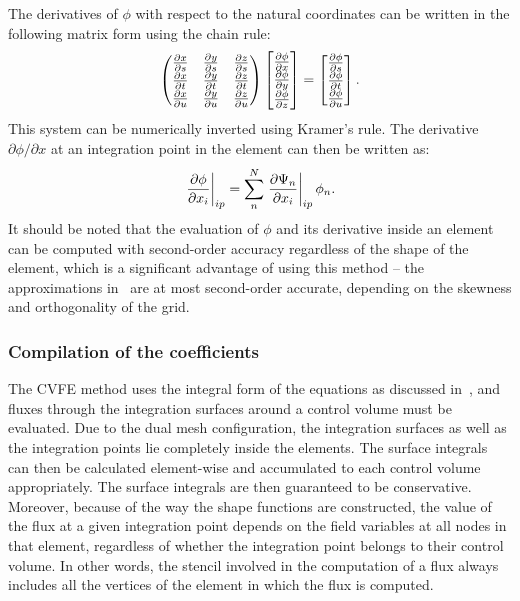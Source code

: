The derivatives of $\phi$ with respect to the natural coordinates can be written in the following matrix form using the chain rule:
\begin{equation*}
    \begin{pmatrix}
         \frac{\partial x}{\partial s}  &  \frac{\partial y}{\partial s}  &  \frac{\partial z}{\partial s}  \\
         \frac{\partial x}{\partial t}  &  \frac{\partial y}{\partial t}  &  \frac{\partial z}{\partial t}  \\
         \frac{\partial x}{\partial u}  &  \frac{\partial y}{\partial u}  &  \frac{\partial z}{\partial u} 
    \end{pmatrix}
    \begin{bmatrix}
         \frac{\partial \phi}{\partial x}  \\
         \frac{\partial \phi}{\partial y}  \\
         \frac{\partial \phi}{\partial z} 
    \end{bmatrix}
    = 
    \begin{bmatrix}
         \frac{\partial \phi}{\partial s}  \\
         \frac{\partial \phi}{\partial t}  \\
         \frac{\partial \phi}{\partial u} 
    \end{bmatrix}.
\end{equation*}
This system can be numerically inverted using Kramer's rule. 
The derivative $\partial \phi/\partial x$ at an integration point in the element can then be written as:
\begin{equation*}
    \left. \frac{\partial \phi}{\partial x_i} \right|_{ip} = \sum_n^N \left. \frac{\partial \Psi_n}{\partial x_i} \right|_{ip}\phi_n.
\end{equation*}
It should be noted that the evaluation of $\phi$ and its derivative inside an element can be computed with second-order accuracy regardless of the shape of the element, which is a significant advantage of using this method -- the approximations in~ are at most second-order accurate, depending on the skewness and orthogonality of the grid.
 

\subsubsection{Compilation of the coefficients}
The CVFE method uses the integral form of the equations as discussed in~, and fluxes through the integration surfaces around a control volume must be evaluated. Due to the dual mesh configuration, the integration surfaces as well as the integration points lie completely inside the elements. The surface integrals can then be calculated element-wise and accumulated to each control volume appropriately. The surface integrals are then guaranteed to be conservative. Moreover, because of the way the shape functions are constructed, the value of the flux at a given integration point depends on the field variables at all nodes in that element, regardless of whether the integration point belongs to their control volume. In other words, the stencil involved in the computation of a flux always includes all the vertices of the element in which the flux is computed.

